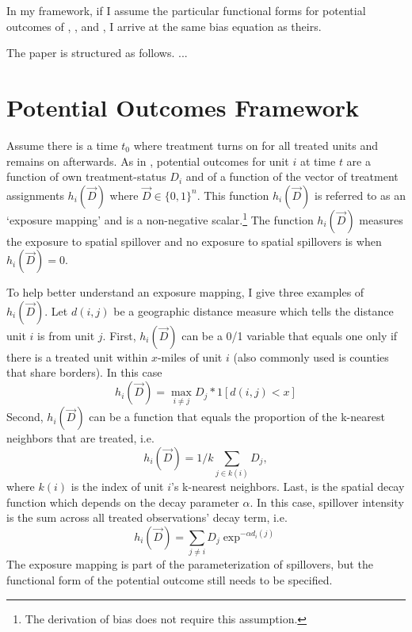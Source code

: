 \documentclass[11pt]{article}
\begin{document}
In my framework, if I assume the particular functional forms for potential outcomes of \citet{Clarke_2017}, \citet{Berg_Streitz_2019}, and \citet{Verbitsky-Savitz_Raudenbush_2012}, I arrive at the same bias equation as theirs. 

The paper is structured as follows. ...









\section{Potential Outcomes Framework}

Assume there is a time $t_0$ where treatment turns on for all treated units and remains on afterwards. As in \citet{Vazquez-Bare_2019}, potential outcomes for unit $i$ at time $t$ are a function of own treatment-status $D_i$ and of a function of the vector of treatment assignments $h_i(\vec{D})$ where $\vec{D} \in \{0,1 \}^n$. This function $h_i(\vec{D})$ is referred to as an `exposure mapping' and is a non-negative scalar.\footnote{The derivation of bias does not require this assumption.} The function $h_i(\vec{D})$ measures the exposure to spatial spillover and no exposure to spatial spillovers is when $h_i(\vec{D}) = 0$.

To help better understand an exposure mapping, I give three examples of $h_i(\vec{D})$. Let $d(i,j)$ be a geographic distance measure which tells the distance unit $i$ is from unit $j$. First, $h_i(\vec{D})$ can be a 0/1 variable that equals one only if there is a treated unit within $x$-miles of unit $i$ (also commonly used is counties that share borders). In this case \[
    h_i(\vec{D}) = \max_{i \neq j} D_j * 1[ d(i,j) < x ] 
\] 
Second, $h_i(\vec{D})$ can be a function that equals the proportion of the k-nearest neighbors that are treated, i.e. \[
    h_i(\vec{D}) = 1/k \sum_{j \in k(i)} D_j,
\]
where $k(i)$ is the index of unit $i$'s k-nearest neighbors. Last, is the spatial decay function which depends on  the decay parameter $\alpha$. In this case, spillover intensity is the sum across all treated observations' decay term, i.e. \[ 
    h_i(\vec{D}) = \sum_{j \neq i} D_j \exp^{-\alpha d_i(j)}
\] 
The exposure mapping is part of the parameterization of spillovers, but the functional form of the potential outcome still needs to be specified. 
\end{document}
